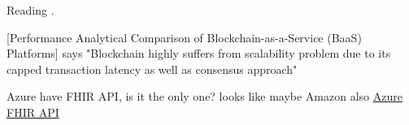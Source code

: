\documentclass{report}
\begin{document}
\begin{flushleft}
Reading \cite{onik_performance_2019}.\linebreak[1]

[Performance Analytical Comparison of Blockchain-as-a-Service (BaaS) Platforms] says "Blockchain highly suffers from scalability problem due to its capped transaction
latency as well as consensus approach"\linebreak[1]

Azure have FHIR API, is it the only one? looks like maybe Amazon also \href{'https://azure.microsoft.com/en-gb/services/azure-api-for-fhir/?ocid=AID754288&wt.mc_id=azfr-c9-scottha%2CCFID0475'}{Azure FHIR API}

\end{flushleft}

\printbibliography
\end{document}
